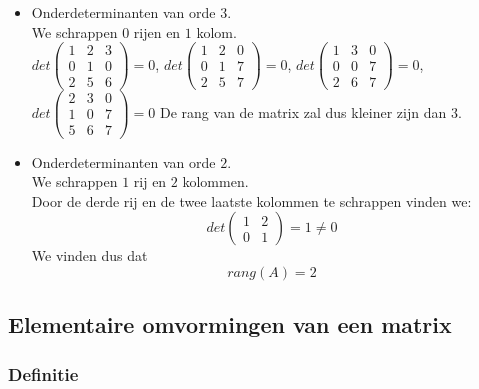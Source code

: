 \begin{itemize}
	\item Onderdeterminanten van orde $3$.\\
	We schrappen $0$ rijen en $1$ kolom.\\
	$det \left( \begin{matrix} 1 & 2 & 3\\ 0 & 1 & 0\\ 2 & 5 & 6 \end{matrix} \right)= 0$, $det \left( \begin{matrix} 1 & 2 & 0\\ 0 & 1 & 7\\ 2 & 5 & 7 \end{matrix} \right)= 0$, $det \left( \begin{matrix} 1 & 3 & 0\\ 0 & 0 & 7\\ 2 & 6 & 7 \end{matrix} \right) =0$,  $det \left( \begin{matrix} 2 & 3 & 0\\ 1 & 0 & 7\\  5 & 6 & 7 \end{matrix} \right) =0$
	De rang van de matrix zal dus kleiner zijn dan $3$.
	\item Onderdeterminanten van orde $2$.\\
	We schrappen $1$ rij en $2$ kolommen.\\
	Door de derde rij en de twee laatste kolommen te schrappen vinden we: 
	\[ det \left( \begin{matrix} 1 & 2 \\ 0 & 1 \end{matrix} \right) = 1 \neq 0 \]
	We vinden dus dat
	\[ rang(A)=2 \] 
\end{itemize}

\newpage

\subsection{Elementaire omvormingen van een matrix}

\subsubsection{Definitie}

